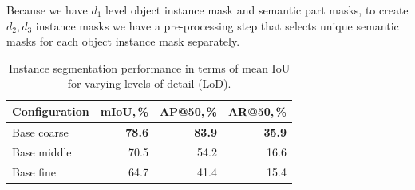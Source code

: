 Because we have $d_1$ level object instance mask and semantic part masks, to create $d_2, d_3$ instance masks we have a pre-processing step that selects unique semantic masks for each object instance mask separately.

\begin{table}[!h]

\caption{Instance segmentation performance in terms of mean IoU for varying levels of detail (LoD).}
\centering
\begin{tabular}{lrrr}
\toprule
Configuration       & mIoU,\,\% & AP@50,\,\%    & AR@50,\,\% \\ 
\midrule
Base coarse         & \textbf{78.6}     & \textbf{83.9} & \textbf{35.9} \\
Base middle         & 70.5     & 54.2         & 16.6 \\
Base fine           & 64.7     & 41.4         & 15.4 \\
\bottomrule
\end{tabular}%
\label{table:instance}

\end{table}

